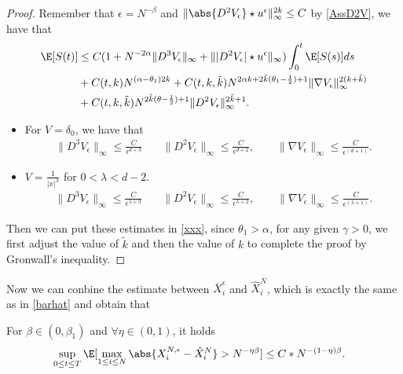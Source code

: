 \begin{proof}
Remember that $\epsilon = N^{-\beta } $ and $\|\abs{D^2 V_\epsilon} \star  u^{\epsilon}  \|_{\infty}^{2k} \le C $ by \autoref{AssD2V}, we have that
\begin{align} \label{xxx}
\E[S(t)] &\le  C(1 + N^{-2 \alpha  } \|D^{3}V_\epsilon \|_{\infty}   + \||D^2 V_{\epsilon}| \star  u^{\epsilon} \|_{\infty} ) \int_0^{t} \E[S(s)] ds\\
&+ C(t,k)N^{(\alpha  - \theta_1)2k} +  C(t,k,\tilde k)N^{2 \alpha  k + 2 \tilde{k}(\theta_1 - \frac{1}{2}) + 1 } \|\nabla V_{\epsilon}\|_{\infty}^{2(k+\tilde{k} )} \\
&+ C(t,k,\tilde k)N^{2 \tilde{k}(\theta  - \frac{1}{2}) + 1 } \|D^2V_{\epsilon}\|_{\infty}^{2\tilde{k}+1}  
.\end{align}

\begin{itemize}
	\item For $V=\delta_0$, we have that 
	\begin{align*}
	\|D^3 V_{\epsilon}\|_{\infty} \le  \frac{C}{\epsilon^{d+3}}\quad &\|D^2 V_{\epsilon}\|_{\infty} \le  \frac{C}{\epsilon^{d+2}},\qquad\|\nabla V_{\epsilon}\|_{\infty} \le  \frac{C}{\epsilon ^{(d+1)} }
	.\end{align*}
	\item $V=\frac{1}{|x|^\lambda}$ for $0<\lambda<d-2$. 	\begin{align*}
	\|D^3 V_{\epsilon}\|_{\infty} \le  \frac{C}{\epsilon^{\lambda+3}}\quad &\|D^2 V_{\epsilon}\|_{\infty} \le  \frac{C}{\epsilon^{\lambda+2}},\qquad\|\nabla V_{\epsilon}\|_{\infty} \le  \frac{C}{\epsilon ^{(\lambda+1)} }
	.\end{align*}
\end{itemize}
Then we can put these estimates in \autoref{xxx}, since $\theta_1>\alpha$, for any given $\gamma>0$, we first adjust the value of $\tilde k$ and then the value of $k$ to complete the proof by Gronwall's inequality.
\end{proof}
Now we can conbine the estimate between $\overline{X}_i^{\epsilon}$ and $\hat{X}_i^{N}$, which is exactly the same as in \autoref{barhat} and obtain that
\begin{corollary} \label{eta} For $\beta\in (0,\beta_1)$ and $\forall\eta\in (0,1)$, it holds
 \begin{align*}
&\sup_{0\leq t\leq T}   \E[\max_{1\leq i\leq N} \abs{X_{i}^{N,\epsilon} - \hat{X}_i^{N} } > N^{-\eta\beta}]\leq C*N^{-(1-\eta)\beta} 
.\end{align*}
\end{corollary}


